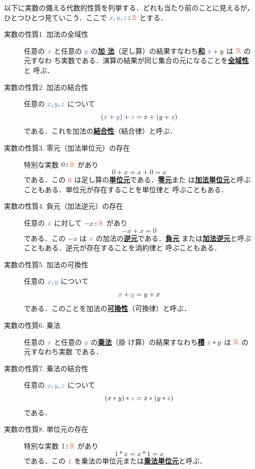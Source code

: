 \documentclass[a5paper,twoside,fleqn,draft]{jsbook}
\def\constantColor{WildStrawberry}
\def\varColor{NavyBlue}
\def\typeColor{RedOrange}
\newcommand{\keyword}[1]{{\underline{\textbf{#1}}}}
\newcommand{\mConstant}[1]{\textcolor{\constantColor}{#1}}
\newcommand{\mZeroNumber}{{\mConstant{0}}}
\newcommand{\mOneNumber}{{\mConstant{1}}}
\newcommand{\mVar}[1]{\textcolor{\varColor}{#1}}
\newcommand{\mXVar}{\mVar{x}}
\newcommand{\mYVar}{\mVar{y}}
\newcommand{\mZVar}{\mVar{z}}
\DeclareMathOperator{\mIn}{{:\!:}}
\newcommand{\mSpecialSet}[1]{\textcolor{\typeColor}{\mathbb{#1}}}
\newcommand{\mRSet}{\mSpecialSet{R}}
\begin{document}
以下に実数の備える代数的性質を列挙する．どれも当たり前のことに見えるが，
ひとつひとつ見ていこう．ここで $\mXVar,\mYVar,\mZVar\mIn\mRSet$ とする．
\begin{description}
\item[実数の性質1. 加法の全域性] 任意の $\mXVar$ と任意の $\mYVar$ の\keyword{加
法}（足し算）の結果すなわち\keyword{和} $\mXVar+y$ は $\mRSet$ の元すなわ
ち実数である．演算の結果が同じ集合の元になることを\keyword{全域性}と
呼ぶ．
\item[実数の性質2. 加法の結合性] 任意の $\mXVar,\mYVar,\mZVar$ について
\begin{equation}
(\mXVar+\mYVar)+\mZVar=x+(y+z)
\end{equation}
である．これを加法の\keyword{結合性}（結合律）と呼ぶ．
\item[実数の性質3. 零元（加法単位元）の存在] 特別な実数 $0\mIn\mRSet$ があり
\begin{equation}
0+x=x+0=x
\end{equation}
である．この $\mZeroNumber$ は足し算の\keyword{単位元}である．\keyword{零元}また
は\keyword{加法単位元}と呼ぶこともある．単位元が存在することを単位律と
呼ぶこともある．
\item[実数の性質4. 負元（加法逆元）の存在] 任意の $\mXVar$ に対して
$-x\mIn\mRSet$ があり
\begin{equation}
-x+x=0
\end{equation}
である．この $-x$ は $\mXVar$ の加法の\keyword{逆元}である．\keyword{負元}
または\keyword{加法逆元}と呼ぶこともある．逆元が存在することを消約律と
呼ぶこともある．
\item[実数の性質5. 加法の可換性] 任意の $\mXVar,\mYVar$ について
\begin{equation}
\mXVar+\mYVar=y+x
\end{equation}
である．このことを加法の\keyword{可換性}（可換律）と呼ぶ．
\item[実数の性質6. 乗法] 任意の $\mXVar$ と任意の $\mYVar$ の\keyword{乗法}（掛
け算）の結果すなわち\keyword{積} $\mXVar*y$ は $\mRSet$ の元すなわち実数
である．
\item[実数の性質7. 乗法の結合性] 任意の $\mXVar,\mYVar,\mZVar$ について
\begin{equation}
(x*y)*\mZVar=x*(y*z)
\end{equation}
である．
\item[実数の性質8. 単位元の存在] 特別な実数 $1\mIn\mRSet$ があり
\begin{equation}
1*x=x*1=x
\end{equation}
である．この $\mOneNumber$ を乗法の単位元または\keyword{乗法単位元}と呼ぶ．

\end{description}
\end{document}
